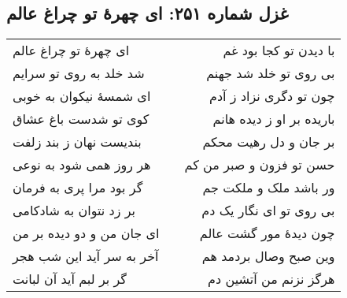 \begin{center}
\section*{غزل شماره ۲۵۱: ای چهرهٔ تو چراغ عالم}
\label{sec:251}
\begin{longtable}{l p{0.5cm} r}
ای چهرهٔ تو چراغ عالم
&&
با دیدن تو کجا بود غم
\\
شد خلد به روی تو سرایم
&&
بی روی تو خلد شد جهنم
\\
ای شمسهٔ نیکوان به خوبی
&&
چون تو دگری نزاد ز آدم
\\
کوی تو شدست باغ عشاق
&&
باریده بر او ز دیده هانم
\\
بندیست نهان ز بند زلفت
&&
بر جان و دل رهیت محکم
\\
هر روز همی شود به نوعی
&&
حسن تو فزون و صبر من کم
\\
گر بود مرا پری به فرمان
&&
ور باشد ملک و ملکت جم
\\
بر زد نتوان به شادکامی
&&
بی روی تو ای نگار یک دم
\\
ای جان من و دو دیده بر من
&&
چون دیدهٔ مور گشت عالم
\\
آخر به سر آید این شب هجر
&&
وین صبح وصال بردمد هم
\\
گر بر لبم آید آن لبانت
&&
هرگز نزنم من آتشین دم
\\
\end{longtable}
\end{center}
